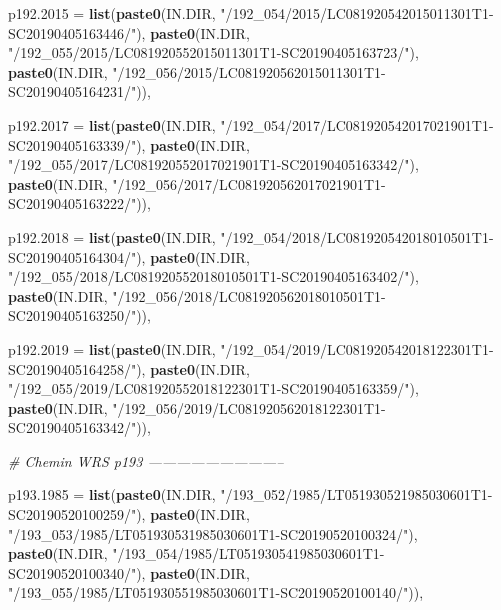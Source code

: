 \documentclass[a4paper, notitlepage, 12pt, krantz2]{krantz}
\newenvironment{Shaded}{\begin{snugshade}}{\end{snugshade}}
\newcommand{\CommentTok}[1]{\textcolor[rgb]{0.56,0.35,0.01}{\textit{#1}}}
\newcommand{\DataTypeTok}[1]{\textcolor[rgb]{0.13,0.29,0.53}{#1}}
\newcommand{\KeywordTok}[1]{\textcolor[rgb]{0.13,0.29,0.53}{\textbf{#1}}}
\newcommand{\NormalTok}[1]{#1}
\newcommand{\StringTok}[1]{\textcolor[rgb]{0.31,0.60,0.02}{#1}}
\begin{document}
\begin{Shaded}
\begin{Highlighting}[]
  \DataTypeTok{p192.2015 =} \KeywordTok{list}\NormalTok{(}\KeywordTok{paste0}\NormalTok{(IN.DIR, }\StringTok{"/192_054/2015/LC081920542015011301T1-SC20190405163446/"}\NormalTok{),}
                   \KeywordTok{paste0}\NormalTok{(IN.DIR, }\StringTok{"/192_055/2015/LC081920552015011301T1-SC20190405163723/"}\NormalTok{),}
                   \KeywordTok{paste0}\NormalTok{(IN.DIR, }\StringTok{"/192_056/2015/LC081920562015011301T1-SC20190405164231/"}\NormalTok{)),}

  \DataTypeTok{p192.2017 =} \KeywordTok{list}\NormalTok{(}\KeywordTok{paste0}\NormalTok{(IN.DIR, }\StringTok{"/192_054/2017/LC081920542017021901T1-SC20190405163339/"}\NormalTok{),}
                   \KeywordTok{paste0}\NormalTok{(IN.DIR, }\StringTok{"/192_055/2017/LC081920552017021901T1-SC20190405163342/"}\NormalTok{),}
                   \KeywordTok{paste0}\NormalTok{(IN.DIR, }\StringTok{"/192_056/2017/LC081920562017021901T1-SC20190405163222/"}\NormalTok{)),}

  \DataTypeTok{p192.2018 =} \KeywordTok{list}\NormalTok{(}\KeywordTok{paste0}\NormalTok{(IN.DIR, }\StringTok{"/192_054/2018/LC081920542018010501T1-SC20190405164304/"}\NormalTok{),}
                   \KeywordTok{paste0}\NormalTok{(IN.DIR, }\StringTok{"/192_055/2018/LC081920552018010501T1-SC20190405163402/"}\NormalTok{),}
                   \KeywordTok{paste0}\NormalTok{(IN.DIR, }\StringTok{"/192_056/2018/LC081920562018010501T1-SC20190405163250/"}\NormalTok{)),}

  \DataTypeTok{p192.2019 =} \KeywordTok{list}\NormalTok{(}\KeywordTok{paste0}\NormalTok{(IN.DIR, }\StringTok{"/192_054/2019/LC081920542018122301T1-SC20190405164258/"}\NormalTok{),}
                   \KeywordTok{paste0}\NormalTok{(IN.DIR, }\StringTok{"/192_055/2019/LC081920552018122301T1-SC20190405163359/"}\NormalTok{),}
                   \KeywordTok{paste0}\NormalTok{(IN.DIR, }\StringTok{"/192_056/2019/LC081920562018122301T1-SC20190405163342/"}\NormalTok{)),}

  \CommentTok{# Chemin WRS p193 -----------------------------}

  \DataTypeTok{p193.1985 =} \KeywordTok{list}\NormalTok{(}\KeywordTok{paste0}\NormalTok{(IN.DIR, }\StringTok{"/193_052/1985/LT051930521985030601T1-SC20190520100259/"}\NormalTok{),}
                   \KeywordTok{paste0}\NormalTok{(IN.DIR, }\StringTok{"/193_053/1985/LT051930531985030601T1-SC20190520100324/"}\NormalTok{),}
                   \KeywordTok{paste0}\NormalTok{(IN.DIR, }\StringTok{"/193_054/1985/LT051930541985030601T1-SC20190520100340/"}\NormalTok{),}
                   \KeywordTok{paste0}\NormalTok{(IN.DIR, }\StringTok{"/193_055/1985/LT051930551985030601T1-SC20190520100140/"}\NormalTok{)),}


\end{Highlighting}
\end{Shaded}
\end{document}
